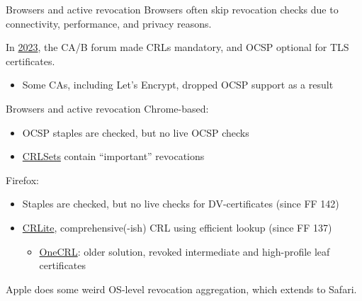 \begin{frame}{Browsers and active revocation}
  Browsers often skip revocation checks due to connectivity, performance, and privacy reasons.

  \vspace*{1em}

  \pause
  In \href{https://cabforum.org/2023/07/14/ballot-sc063v4-make-ocsp-optional-require-crls-and-incentivize-automation/}{2023}, the CA/B forum made CRLs mandatory, and OCSP optional for TLS certificates.
  \begin{itemize}[<+(1)->]
    \item Some CAs, including Let's Encrypt, dropped OCSP support as a result
  \end{itemize}
\end{frame}

\begin{frame}{Browsers and active revocation}
  Chrome-based:
  \begin{itemize}[<+(1)->]
    \item OCSP staples are checked, but no live OCSP checks
    \item \href{https://www.chromium.org/Home/chromium-security/crlsets/}{CRLSets} contain \enquote{important} revocations
  \end{itemize}

  \vspace*{1em}

  \pause
  Firefox:
  \begin{itemize}[<+(1)->]
    \item Staples are checked, but no live checks for DV-certificates (since FF 142)
    \item \href{https://hacks.mozilla.org/2025/08/crlite-fast-private-and-comprehensive-certificate-revocation-checking-in-firefox/}{CRLite}, comprehensive(-ish) CRL using efficient lookup (since FF 137)
    \par
    \begin{itemize}
      \item \href{https://wiki.mozilla.org/CA/Revocation_Checking_in_Firefox\#OneCRL}{OneCRL}: older solution, revoked intermediate and high-profile leaf certificates
    \end{itemize}
  \end{itemize}

  \vspace*{1em}

  \pause
  Apple does some weird OS-level revocation aggregation, which extends to Safari.
\end{frame}

